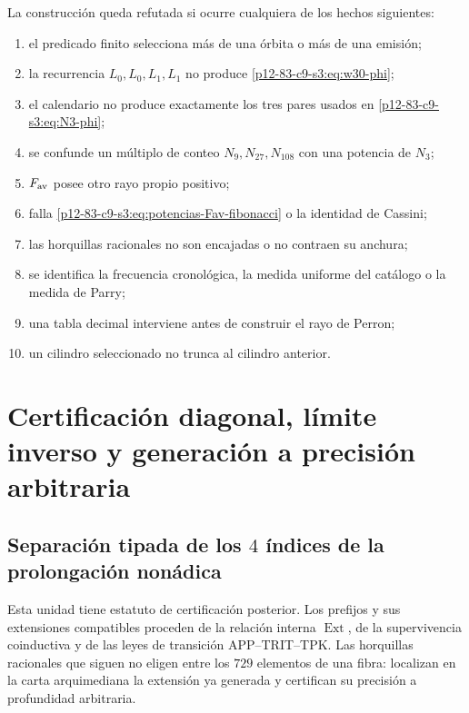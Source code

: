 \begin{criterion}
La construcción queda refutada si ocurre cualquiera de los hechos
siguientes:
\begin{enumerate}
 \item el predicado finito selecciona más de una órbita o más de una emisión;
 \item la recurrencia \(L_0,L_0,L_1,L_1\) no produce
       \eqref{p12-83-c9-s3:eq:w30-phi};
 \item el calendario no produce exactamente los tres pares usados en
       \eqref{p12-83-c9-s3:eq:N3-phi};
 \item se confunde un múltiplo de conteo \(N_{9},N_{27},N_{108}\) con una
       potencia de \(N_3\);
 \item \(F_{\rm av}\) posee otro rayo propio positivo;
 \item falla \eqref{p12-83-c9-s3:eq:potencias-Fav-fibonacci} o la identidad de Cassini;
 \item las horquillas racionales no son encajadas o no contraen su anchura;
 \item se identifica la frecuencia cronológica, la medida uniforme del
       catálogo o la medida de Parry;
 \item una tabla decimal interviene antes de construir el rayo de Perron;
 \item un cilindro seleccionado no trunca al cilindro anterior.
\end{enumerate}
\end{criterion}



\section{Certificación diagonal, límite inverso y generación a precisión arbitraria}
\label{p12-83-c9-s4:chap:precision-arbitraria-constantes}

\subsection{Separación tipada de los \(4\) índices de la prolongación nonádica}

Esta unidad tiene estatuto de certificación posterior. Los prefijos y sus
extensiones compatibles proceden de la relación interna
\(\operatorname{Ext}\), de la supervivencia coinductiva y de las leyes de
transición APP--TRIT--TPK. Las horquillas racionales que siguen no eligen
entre los \(729\) elementos de una fibra: localizan en la carta arquimediana
la extensión ya generada y certifican su precisión a profundidad arbitraria.

